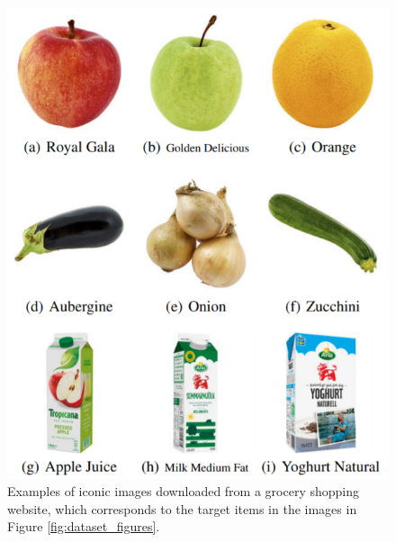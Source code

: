 \begin{figure}[t]
\begin{minipage}[b]{0.47\textwidth}
	    \includegraphics[scale=0.5]{PaperB/figures_and_tables/figure2.png}
		\caption{Examples of iconic images downloaded from a grocery shopping website, which corresponds to the target items in the images in Figure \ref{fig:dataset_figures}. \newline}
		\label{fig:iconic_image_figures}
	\end{minipage} 
	\vspace{-3mm}
\end{figure}


